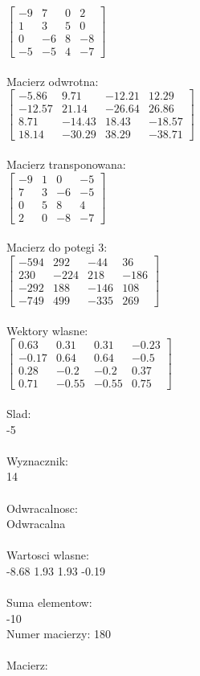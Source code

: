 \documentclass[a4paper,12pt]{article}
\begin{document}
$\begin{bmatrix} -9&7&0&2\\1&3&5&0\\0&-6&8&-8\\-5&-5&4&-7 \end{bmatrix}$
\\
\\
Macierz odwrotna:\\

$\begin{bmatrix} -5.86&9.71&-12.21&12.29\\-12.57&21.14&-26.64&26.86\\8.71&-14.43&18.43&-18.57\\18.14&-30.29&38.29&-38.71 \end{bmatrix}$
\\
\\
Macierz transponowana:\\

$\begin{bmatrix} -9&1&0&-5\\7&3&-6&-5\\0&5&8&4\\2&0&-8&-7 \end{bmatrix}$
\\
\\
Macierz do potegi 3:\\

$\begin{bmatrix} -594&292&-44&36\\230&-224&218&-186\\-292&188&-146&108\\-749&499&-335&269 \end{bmatrix}$
\\
\\
Wektory wlasne:\\

$\begin{bmatrix} 0.63&0.31&0.31&-0.23\\-0.17&0.64&0.64&-0.5\\0.28&-0.2&-0.2&0.37\\0.71&-0.55&-0.55&0.75 \end{bmatrix}$
\\
\\
Slad:\\
-5
\\
\\
Wyznacznik:\\
14
\\
\\
Odwracalnosc:\\
Odwracalna
\\
\\
Wartosci wlasne:\\
-8.68 1.93 1.93 -0.19
\\
\\
Suma elementow:\\
-10
\\
\newpage
Numer macierzy:
180
\\
\\
Macierz:\\
\end{document}
